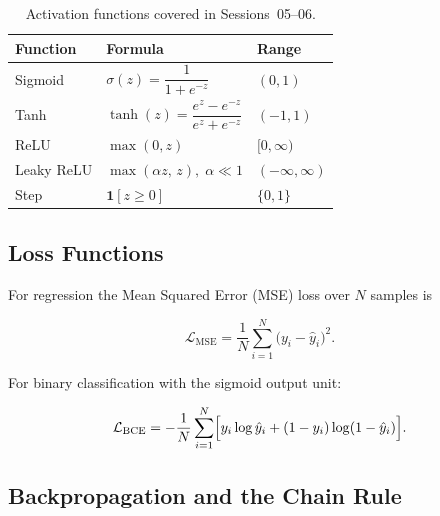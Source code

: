 \documentclass[12pt,a4paper]{article}
\newcommand{\loss}{\mathcal{L}}
\begin{document}
\begin{table}[htbp]
  \centering
  \caption{Activation functions covered in Sessions~05--06.}
  \label{tab:activations}
  \begin{tabular}{lll}
    \toprule
    \textbf{Function} & \textbf{Formula} & \textbf{Range} \\
    \midrule
    Sigmoid   & $\sigma(z)=\dfrac{1}{1+e^{-z}}$            & $(0,1)$ \\[6pt]
    Tanh      & $\tanh(z)=\dfrac{e^z-e^{-z}}{e^z+e^{-z}}$ & $(-1,1)$ \\[6pt]
    ReLU      & $\max(0,z)$                                 & $[0,\infty)$ \\[4pt]
    Leaky ReLU & $\max(\alpha z,\,z),\;\alpha\ll 1$         & $(-\infty,\infty)$ \\[4pt]
    Step      & $\mathbf{1}[z \geq 0]$                      & $\{0,1\}$ \\
    \bottomrule
  \end{tabular}
\end{table}

\subsection{Loss Functions}
\label{ssec:loss}

For regression the Mean Squared Error (MSE) loss over $N$ samples is

\begin{equation}
  \loss_{\text{MSE}} = \frac{1}{N}\sum_{i=1}^{N}\bigl(y_i - \hat{y}_i\bigr)^2.
  \label{eq:mse}
\end{equation}

\noindent
For binary classification with the sigmoid output unit:

\begin{equation}
  \loss_{\text{BCE}} = -\frac{1}{N}\sum_{i=1}^{N}
    \Bigl[y_i \log\hat{y}_i + (1-y_i)\log(1-\hat{y}_i)\Bigr].
  \label{eq:bce}
\end{equation}

\subsection{Backpropagation and the Chain Rule}
\label{ssec:backprop}
\end{document}
